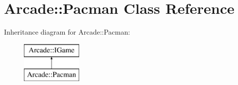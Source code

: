 \hypertarget{class_arcade_1_1_pacman}{}\section{Arcade\+:\+:Pacman Class Reference}
\label{class_arcade_1_1_pacman}
Inheritance diagram for Arcade\+:\+:Pacman\+:\begin{figure}[H]
\begin{center}
\leavevmode
\includegraphics[height=2.000000cm]{class_arcade_1_1_pacman}
\end{center}
\end{figure}
